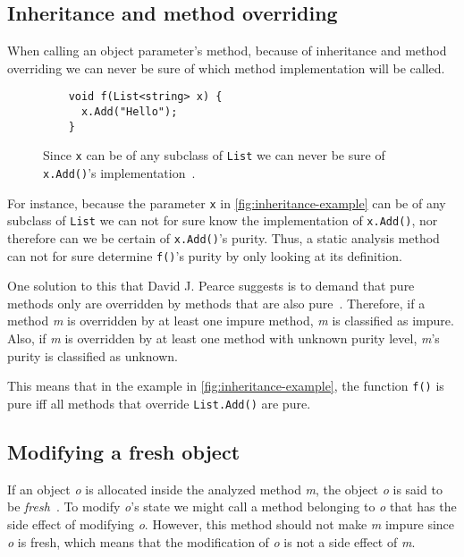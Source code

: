 \documentclass[a4paper,12pt]{article}
\begin{document}
\subsection{Inheritance and method overriding} \label{sub:inheritance}

When calling an object parameter's method, because of inheritance and method overriding we can never be sure of which method implementation will be called.

\begin{figure}
  \centering
  \begin{lstlisting}
    void f(List<string> x) {
      x.Add("Hello");
    }
  \end{lstlisting}
  \caption{Since \texttt{x} can be of any subclass of \texttt{List} we can never be sure of \texttt{x.Add()}'s implementation~\cite{pearce2011jpure}.}
  \label{fig:inheritance-example}
\end{figure}

For instance, because the parameter \texttt{x} in \autoref{fig:inheritance-example} can be of any subclass of \texttt{List} we can not for sure know the implementation of \texttt{x.Add()}, nor therefore can we be certain of \texttt{x.Add()}'s purity. Thus, a static analysis method can not for sure determine \texttt{f()}'s purity by only looking at its definition.

One solution to this that David J. Pearce suggests is to demand that pure methods only are overridden by methods that are also pure~\cite{pearce2011jpure}. Therefore, if a method \textit{m} is overridden by at least one impure method, \textit{m} is classified as impure. Also, if \textit{m} is overridden by at least one method with unknown purity level, \textit{m}'s purity is classified as unknown.

This means that in the example in \autoref{fig:inheritance-example}, the function \texttt{f()} is pure iff all methods that override \texttt{List.Add()} are pure.

\subsection{Modifying a fresh object} \label{sub:modifying-fresh-objects}

If an object \textit{o} is allocated inside the analyzed method \textit{m}, the object \textit{o} is said to be \textit{fresh}~\cite{pearce2011jpure}. To modify \textit{o}'s state we might call a method belonging to \textit{o} that has the side effect of modifying \textit{o}. However, this method should not make \textit{m} impure since \textit{o} is fresh, which means that the modification of \textit{o} is not a side effect of \textit{m}.
\end{document}
